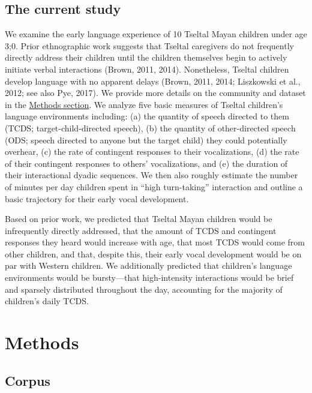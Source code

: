 \documentclass[floatsintext,man]{apa6}
\theoremstyle{definition}
\theoremstyle{definition}
\theoremstyle{definition}
\theoremstyle{remark}
\begin{document}
\subsection{The current study}\label{intro-currentstudy}

We examine the early language experience of 10 Tseltal Mayan children
under age 3;0. Prior ethnographic work suggests that Tseltal caregivers
do not frequently directly address their children until the children
themselves begin to actively initiate verbal interactions (Brown, 2011,
2014). Nonetheless, Tseltal children develop language with no apparent
delays (Brown, 2011, 2014; Liszkowski et al., 2012; see also Pye, 2017).
We provide more details on the community and dataset in the
\protect\hyperlink{methods}{Methods section}. We analyze five basic
measures of Tseltal children's language environments including: (a) the
quantity of speech directed to them (TCDS; target-child-directed
speech), (b) the quantity of other-directed speech (ODS; speech directed
to anyone but the target child) they could potentially overhear, (c) the
rate of contingent responses to their vocalizations, (d) the rate of
their contingent responses to others' vocalizations, and (e) the
duration of their interactional dyadic sequences. We then also roughly
estimate the number of minutes per day children spent in \enquote{high
turn-taking} interaction and outline a basic trajectory for their early
vocal development.

Based on prior work, we predicted that Tseltal Mayan children would be
infrequently directly addressed, that the amount of TCDS and contingent
responses they heard would increase with age, that most TCDS would come
from other children, and that, despite this, their early vocal
development would be on par with Western children. We additionally
predicted that children's language environments would be bursty---that
high-intensity interactions would be brief and sparsely distributed
throughout the day, accounting for the majority of children's daily
TCDS.

\hypertarget{methods}{\section{Methods}\label{methods}}

\subsection{Corpus}\label{methods-dataset}
\end{document}
